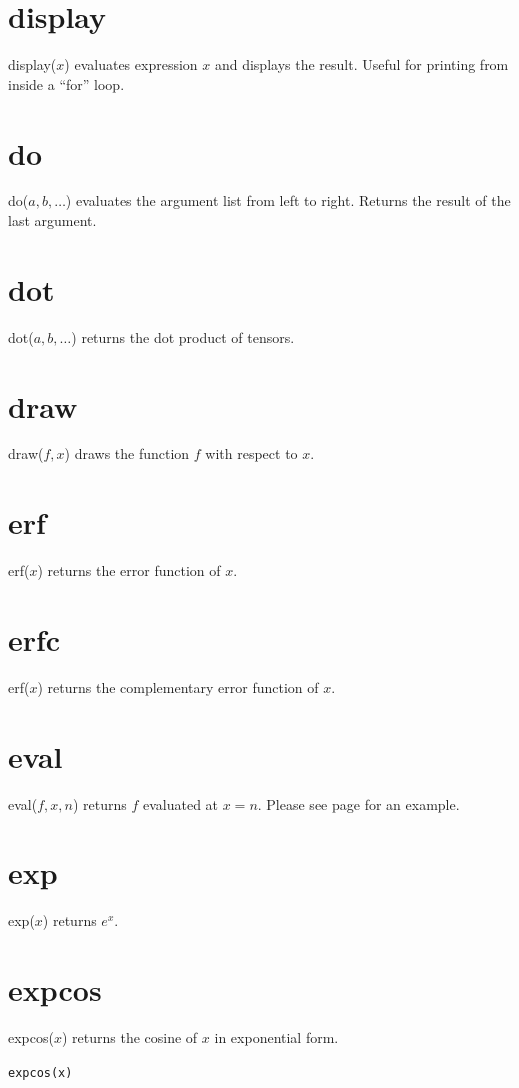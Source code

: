 \documentclass[12pt]{book}
\begin{document}
\section*{display}
display($x$) evaluates expression $x$ and displays the result.
Useful for printing from inside a ``for'' loop.

\section*{do}
do($a,b,\ldots$) evaluates the argument list from left to right.
Returns the result of the last argument.

\section*{dot}
dot($a,b,\ldots$) returns the dot product of tensors.

\section*{draw}
draw($f,x$) draws the function $f$ with respect to $x$.

\section*{erf}
erf($x$) returns the error function of $x$.

\section*{erfc}
erf($x$) returns the complementary error function of $x$.

\section*{eval}
eval($f,x,n$) returns $f$ evaluated at $x=n$.
Please see page \pageref{integral} for an example.

\section*{exp}
exp($x$) returns $e^x$.

\section*{expcos}
expcos($x$) returns the cosine of $x$ in exponential form.

\medskip
{\tt expcos(x)}
\end{document}
